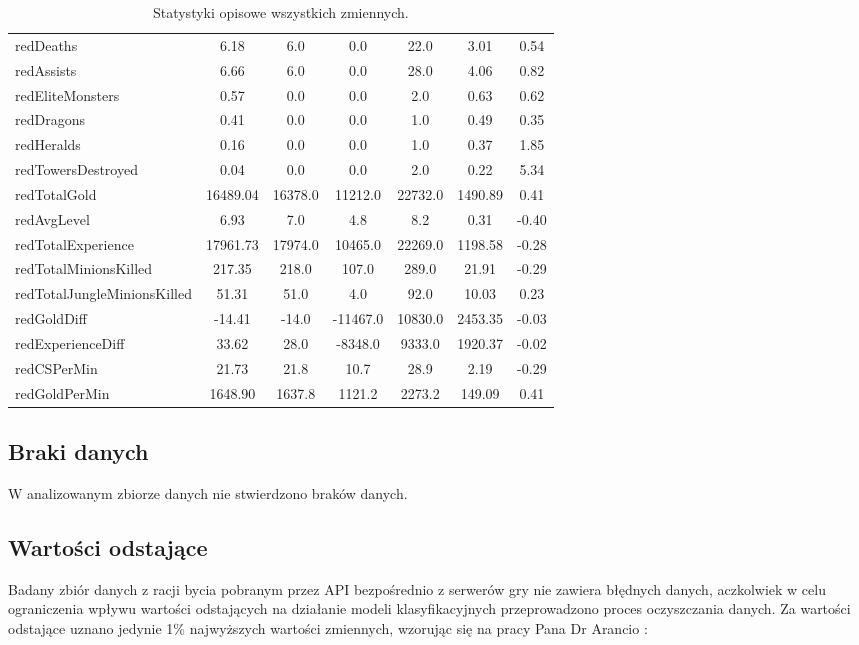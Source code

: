 \documentclass[twoside]{customStyle}
\begin{document}
\begin{table}[H]
{\begin{tabular}{l *{6}{c}}
redDeaths & 6.18 & 6.0 & 0.0 & 22.0 & 3.01 & 0.54 \\
redAssists & 6.66 & 6.0 & 0.0 & 28.0 & 4.06 & 0.82 \\
redEliteMonsters & 0.57 & 0.0 & 0.0 & 2.0 & 0.63 & 0.62 \\
redDragons & 0.41 & 0.0 & 0.0 & 1.0 & 0.49 & 0.35 \\
redHeralds & 0.16 & 0.0 & 0.0 & 1.0 & 0.37 & 1.85 \\
redTowersDestroyed & 0.04 & 0.0 & 0.0 & 2.0 & 0.22 & 5.34 \\
redTotalGold & 16489.04 & 16378.0 & 11212.0 & 22732.0 & 1490.89 & 0.41 \\
redAvgLevel & 6.93 & 7.0 & 4.8 & 8.2 & 0.31 & -0.40 \\
redTotalExperience & 17961.73 & 17974.0 & 10465.0 & 22269.0 & 1198.58 & -0.28 \\
redTotalMinionsKilled & 217.35 & 218.0 & 107.0 & 289.0 & 21.91 & -0.29 \\
redTotalJungleMinionsKilled & 51.31 & 51.0 & 4.0 & 92.0 & 10.03 & 0.23 \\
redGoldDiff & -14.41 & -14.0 & -11467.0 & 10830.0 & 2453.35 & -0.03 \\
redExperienceDiff & 33.62 & 28.0 & -8348.0 & 9333.0 & 1920.37 & -0.02 \\
redCSPerMin & 21.73 & 21.8 & 10.7 & 28.9 & 2.19 & -0.29 \\
redGoldPerMin & 1648.90 & 1637.8 & 1121.2 & 2273.2 & 149.09 & 0.41 \\
\bottomrule
\end{tabular}
}
\caption{Statystyki opisowe wszystkich zmiennych.}
\end{table}

\subsection{Braki danych}
W analizowanym zbiorze danych nie stwierdzono braków danych.

\subsection{Wartości odstające}
Badany zbiór danych z racji bycia pobranym przez API bezpośrednio z serwerów gry nie zawiera błędnych danych, aczkolwiek w celu ograniczenia wpływu wartości odstających na działanie modeli klasyfikacyjnych przeprowadzono proces oczyszczania danych. Za wartości odstające uznano jedynie 1\% najwyższych wartości zmiennych, wzorując się na pracy Pana Dr Arancio \cite{arancio_decisions_10min}:
\end{document}
